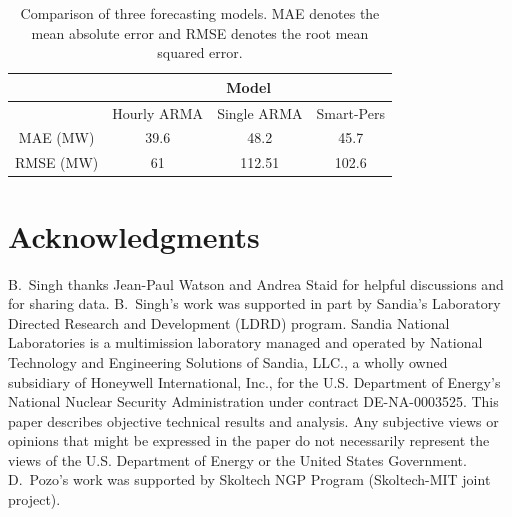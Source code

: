 \documentclass[11pt]{article} %
\begin{document}
\begin{table}[h!]
\centering
\caption{Comparison of three forecasting models. MAE denotes the mean absolute error and RMSE denotes the root mean squared error.}
\label{tab:compare}
\begin{tabular}{c|ccc}
\toprule
\multicolumn{1}{l}{} & \multicolumn{3}{c}{Model}              \\ \hline
& Hourly ARMA & Single ARMA & Smart-Pers \\ \hline
MAE (MW)                 & 39.6        & 48.2        & 45.7   \\
RMSE (MW)                & 61          & 112.51      & 102.6   \\ \bottomrule
\end{tabular}
\end{table}


\section*{Acknowledgments} 
B.\ Singh thanks Jean-Paul Watson and Andrea Staid for helpful discussions and for sharing data. B.\ Singh's work was supported in part by Sandia's Laboratory Directed Research and Development (LDRD) program.
Sandia National Laboratories is a multimission laboratory managed and operated 
by National Technology and Engineering Solutions of Sandia, LLC., a wholly owned
subsidiary of Honeywell International, Inc., for the U.S. Department of 
Energy's 
National Nuclear Security Administration under contract DE-NA-0003525. This paper describes objective technical results and analysis. Any subjective 
views or opinions that might be expressed in the paper do not necessarily 
represent the views of the U.S. Department of Energy or the United States 
Government. 
D.\ Pozo's work was supported by Skoltech NGP Program (Skoltech-MIT joint 
project).




\end{document}
